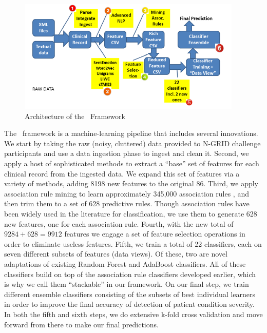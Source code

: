 \begin{figure}[h!t]
	\centering
	\includegraphics[width=0.95\textwidth]{figures/arch.png}
	\caption{Architecture of the \CREATE\ Framework}	
	\label{fig:arch}
\end{figure} 

The \CREATE\ framework is a machine-learning pipeline that includes several innovations. We start by taking the raw (noisy, cluttered) data provided to N-GRID challenge participants and use a data ingestion phase to ingest and clean it.
Second, we apply a host of sophisticated methods to extract a ``base'' set of  features for each clinical record from the ingested data. We expand this set of features
via a variety of methods, adding  8198 new features to the original 86. 
Third, we apply association rule mining to learn approximately 345,000 association rules
\cite{fpgrowth,c5}, and then trim them to a set of 628 predictive rules. Though association rules have been widely used in the literature for classification, we use them to generate 628 new features, one for each association rule.
Fourth, with the new total of $9284+628=9912$ features we engage a set of 
feature selection operations in order to eliminate useless features. 
Fifth, we train a total of 22 classifiers, each on seven different subsets
of features (data views). Of these, two are novel adaptations of existing Random Forest \cite{ho95,breiman01} and AdaBoost \cite{adaboost} classifiers. 
All of these classifiers build on top of the association rule classifiers developed earlier,
which is why we call them ``stackable'' in our framework. On our final step, 
we train different ensemble classifiers consisting of the subsets of best 
individual learners in order to improve the final accuracy of detection of
patient condition severity. In both the fifth and sixth steps, we do extensive k-fold cross validation and move forward from there to make our final predictions.

